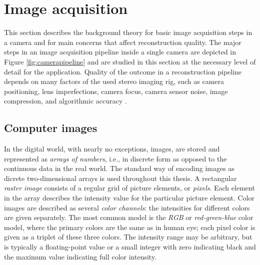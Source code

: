 


\section{Image acquisition} \label{sec:image-acquisition}




This section describes the background theory for basic image acquisition steps in a camera and for main concerns that affect reconstruction quality.
The major steps in an image acquisition pipeline inside a single camera are depicted in Figure \ref{fig:camerapipeline} and are studied in this section at the necessary level of detail for the application.
Quality of the outcome in a reconstruction pipeline depends on many factors of the used stereo imaging rig, such as camera positioning, lens imperfections, camera focus, camera sensor noise, image compression, and algorithmic accuracy \cite{hollsten2013imagequality,kyto2011method,rieke2009evaluation}.



\subsection{Computer images} \label{sec:computer-images}

In the digital world, with nearly no exceptions, images, are stored and represented as \emph{arrays of numbers}, i.e., in discrete form as opposed to the continuous data in the real world.
The standard way of encoding images as dicrete two-dimensional arrays is used throughout this thesis.
A rectangular \emph{raster image} consists of a regular grid of picture elements, or \emph{pixels}.
Each element in the array describes the intensity value for the particular picture element.
Color images are described as several \emph{color channels}: the intensities for different colors are given separately.
The most common model is the \emph{RGB} or \emph{red-green-blue} color model, where the primary colors are the same as in human eye; each pixel color is given as a triplet of these three colors.
The intensity range may be arbitrary, but is typically a floating-point value or a small integer with zero indicating black and the maximum value indicating full color intensity.
\cite{pitas2000digital}

